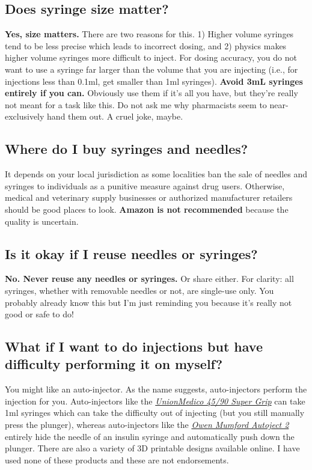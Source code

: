 \documentclass{article}
\begin{document}
\subsection{Does syringe size matter?}

\textbf{Yes, size matters.} There are two reasons for this. 1) Higher volume syringes tend to be less precise which leads to incorrect dosing, and 2) physics makes higher volume syringes more difficult to inject. For dosing accuracy, you do not want to use a syringe far larger than the volume that you are injecting (i.e., for injections less than 0.1ml, get smaller than 1ml syringes). \textbf{Avoid 3mL syringes entirely if you can.} Obviously use them if it’s all you have, but they’re really not meant for a task like this. Do not ask me why pharmacists seem to near-exclusively hand them out. A cruel joke, maybe.

\subsection{Where do I buy syringes and needles?}

It depends on your local jurisdiction as some localities ban the sale of needles and syringes to individuals as a punitive measure against drug users. Otherwise, medical and veterinary supply businesses or authorized manufacturer retailers should be good places to look. \textbf{Amazon is not recommended} because the quality is uncertain.

\subsection{Is it okay if I reuse needles or syringes?}

\textbf{No. Never reuse any needles or syringes.} Or share either. For clarity: all syringes, whether with removable needles or not, are single-use only. You probably already know this but I’m just reminding you because it’s really not good or safe to do!

\subsection{What if I want to do injections but have difficulty performing it on myself?}\label{5-21}

You might like an auto-injector. As the name suggests, auto-injectors perform the injection for you. Auto-injectors like the \href{https://unionmedico.com/90-super-grip/}{\textit{UnionMedico 45/90 Super Grip}} can take 1ml syringes which can take the difficulty out of injecting (but you still manually press the plunger), whereas auto-injectors like the \href{https://www.youtube.com/watch?v=hPbhEpUN43Y}{\textit{Owen Mumford Autoject 2}} entirely hide the needle of an insulin syringe and automatically push down the plunger. There are also a variety of 3D printable designs available online. I have used none of these products and these are not endorsements.
\end{document}
